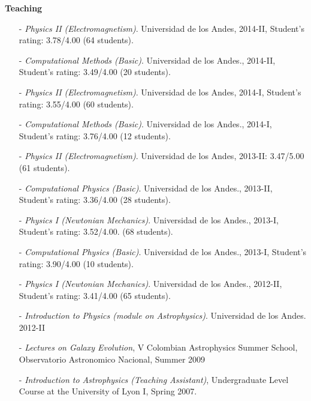 \documentclass[letterpaper,11pt,onecolumn]{article}
\begin{document}
{\bf Teaching}
\begin{itemize}

\item[-] {\it Physics II (Electromagnetism)}. Universidad de
  los Andes, 2014-II, Student's rating: 3.78/4.00 (64 students).  
\item[-] {\it Computational Methods (Basic)}. Universidad de los
  Andes., 2014-II, Student's rating: 3.49/4.00 (20 students).
\item[-] {\it Physics II (Electromagnetism)}. Universidad de
  los Andes, 2014-I, Student's rating: 3.55/4.00 (60 students).  
\item[-] {\it Computational Methods (Basic)}. Universidad de los
  Andes., 2014-I, Student's rating: 3.76/4.00 (12 students).
\item[-] {\it Physics II (Electromagnetism)}. Universidad de
  los Andes, 2013-II: 3.47/5.00 (61 students).
\item[-] {\it Computational Physics (Basic)}. Universidad de los
  Andes., 2013-II, Student's rating: 3.36/4.00 (28 students).
\item[-] {\it Physics I (Newtonian Mechanics)}. Universidad
  de los Andes., 2013-I, Student's rating: 3.52/4.00. (68 students).
\item[-] {\it Computational Physics (Basic)}. Universidad de los
  Andes., 2013-I, Student's rating: 3.90/4.00 (10 students).
\item[-] {\it Physics I (Newtonian Mechanics)}. Universidad
  de los Andes., 2012-II, Student's rating: 3.41/4.00 (65 students).
\item[-] {\it Introduction to Physics (module on
  Astrophysics)}. Universidad de los Andes.  2012-II
\item[-]{\it Lectures on Galaxy Evolution}, V Colombian
  Astrophysics Summer School, Observatorio Astronomico Nacional, Summer 2009
\item[-]{\it{Introduction to Astrophysics (Teaching
      Assistant)}}, Undergraduate Level Course at the University of Lyon I,
      Spring 2007.
\end{itemize}
\end{document}
